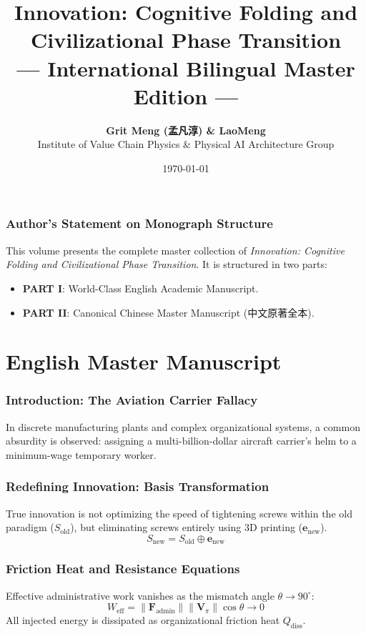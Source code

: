 \documentclass[11pt,a4paper]{article}
\title{\textbf{Innovation: Cognitive Folding and Civilizational Phase Transition}\\ \large — International Bilingual Master Edition —}
\author{\textbf{Grit Meng (孟凡淳) \& LaoMeng}\\ \small Institute of Value Chain Physics \& Physical AI Architecture Group}
\date{\today}
\begin{document}
\maketitle

\section*{Author's Statement on Monograph Structure}
This volume presents the complete master collection of \emph{Innovation: Cognitive Folding and Civilizational Phase Transition}. It is structured in two parts:
\begin{itemize}
    \item \textbf{PART I}: World-Class English Academic Manuscript.
    \item \textbf{PART II}: Canonical Chinese Master Manuscript (中文原著全本).
\end{itemize}

\newpage
\part{English Master Manuscript}

\section{Introduction: The Aviation Carrier Fallacy}
In discrete manufacturing plants and complex organizational systems, a common absurdity is observed: assigning a multi-billion-dollar aircraft carrier's helm to a minimum-wage temporary worker.

\section{Redefining Innovation: Basis Transformation}
True innovation is not optimizing the speed of tightening screws within the old paradigm ($S_{\text{old}}$), but eliminating screws entirely using 3D printing ($\mathbf{e}_{\text{new}}$).
\begin{equation}
S_{\text{new}} = S_{\text{old}} \oplus \mathbf{e}_{\text{new}}
\end{equation}

\section{Friction Heat and Resistance Equations}
Effective administrative work vanishes as the mismatch angle $\theta \to 90^\circ$:
\begin{equation}
W_{\text{eff}} = \|\mathbf{F}_{\text{admin}}\| \|\mathbf{V}_\pi\| \cos \theta \to 0
\end{equation}
All injected energy is dissipated as organizational friction heat $Q_{\text{diss}}$.
\end{document}
